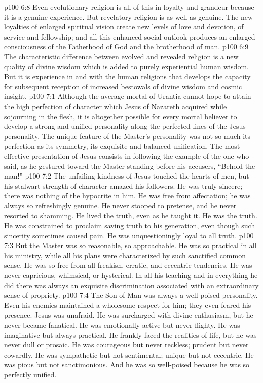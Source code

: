 \vs p100 6:8 \pc Even evolutionary religion is all of this in loyalty and grandeur because it is a genuine experience. But revelatory religion is  as well as genuine. The new loyalties of enlarged spiritual vision create new levels of love and devotion, of service and fellowship; and all this enhanced social outlook produces an enlarged consciousness of the Fatherhood of God and the brotherhood of man.
\vs p100 6:9 The characteristic difference between evolved and revealed religion is a new quality of divine wisdom which is added to purely experiential human wisdom. But it is experience in and with the human religions that develops the capacity for subsequent reception of increased bestowals of divine wisdom and cosmic insight.
\vs p100 7:1 Although the average mortal of Urantia cannot hope to attain the high perfection of character which Jesus of Nazareth acquired while sojourning in the flesh, it is altogether possible for every mortal believer to develop a strong and unified personality along the perfected lines of the Jesus personality. The unique feature of the Master’s personality was not so much its perfection as its symmetry, its exquisite and balanced unification. The most effective presentation of Jesus consists in following the example of the one who said, as he gestured toward the Master standing before his accusers, “Behold the man!”
\vs p100 7:2 The unfailing kindness of Jesus touched the hearts of men, but his stalwart strength of character amazed his followers. He was truly sincere; there was nothing of the hypocrite in him. He was free from affectation; he was always so refreshingly genuine. He never stooped to pretense, and he never resorted to shamming. He lived the truth, even as he taught it. He was the truth. He was constrained to proclaim saving truth to his generation, even though such sincerity sometimes caused pain. He was unquestioningly loyal to all truth.
\vs p100 7:3 But the Master was so reasonable, so approachable. He was so practical in all his ministry, while all his plans were characterized by such sanctified common sense. He was so free from all freakish, erratic, and eccentric tendencies. He was never capricious, whimsical, or hysterical. In all his teaching and in everything he did there was always an exquisite discrimination associated with an extraordinary sense of propriety.
\vs p100 7:4 The Son of Man was always a well\hyp{}poised personality. Even his enemies maintained a wholesome respect for him; they even feared his presence. Jesus was unafraid. He was surcharged with divine enthusiasm, but he never became fanatical. He was emotionally active but never flighty. He was imaginative but always practical. He frankly faced the realities of life, but he was never dull or prosaic. He was courageous but never reckless; prudent but never cowardly. He was sympathetic but not sentimental; unique but not eccentric. He was pious but not sanctimonious. And he was so well\hyp{}poised because he was so perfectly unified.
